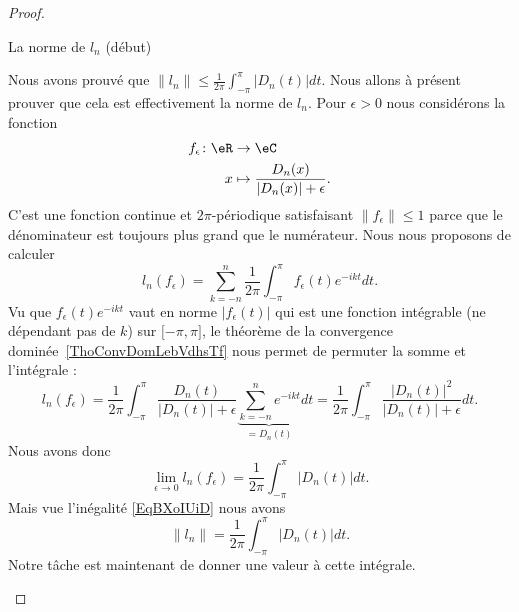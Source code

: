 \begin{proof}
\begin{subproof}
        \item[La norme de \( l_n\) (début)]

            Nous avons prouvé que \( \| l_n \|\leq \frac{1}{ 2\pi }\int_{-\pi}^{\pi}| D_n(t) |dt\). Nous allons à présent prouver que cela est effectivement la norme de \( l_n\). Pour \( \epsilon>0\) nous considérons la fonction
            \begin{equation}
                \begin{aligned}
                    f_{\epsilon}\colon \eR&\to \eC \\
                    x&\mapsto \frac{ D_n(x) }{ | D_n(x) |+\epsilon }.
                \end{aligned}
            \end{equation}
            C'est une fonction continue et \( 2\pi\)-périodique satisfaisant \( \| f_{\epsilon} \|\leq 1\) parce que le dénominateur est toujours plus grand que le numérateur. Nous nous proposons de calculer
            \begin{equation}
                l_n(f_{\epsilon})=\sum_{k=-n}^n\frac{1}{ 2\pi }\int_{-\pi}^{\pi}f_{\epsilon}(t) e^{-ikt}dt.
            \end{equation}
            Vu que \( f_{\epsilon}(t) e^{-ikt}\) vaut en norme \( | f_{\epsilon}(t) |\) qui est une fonction intégrable (ne dépendant pas de \( k\)) sur \( \mathopen[ -\pi , \pi \mathclose]\), le théorème de la convergence dominée~\ref{ThoConvDomLebVdhsTf} nous permet de permuter la somme et l'intégrale :
            \begin{equation}
                l_n(f_{\epsilon})=\frac{1}{ 2\pi }\int_{-\pi}^{\pi}\frac{ D_n(t) }{ | D_n(t) |+\epsilon }\underbrace{\sum_{k=-n}^n e^{-ikt}}_{=D_n(t)}dt=\frac{1}{ 2\pi }\int_{-\pi}^{\pi}\frac{ \big| D_n(t) \big|^2 }{ | D_n(t) |+\epsilon }dt.
            \end{equation}
            Nous avons donc
            \begin{equation}
                \lim_{\epsilon\to 0}l_n(f_{\epsilon})=\frac{1}{ 2\pi }\int_{-\pi}^{\pi}| D_n(t) |dt.
            \end{equation}
            Mais vue l'inégalité \eqref{EqBXoIUiD} nous avons
            \begin{equation}
                \| l_n \|=\frac{1}{ 2\pi }\int_{-\pi}^{\pi}| D_n(t) |dt.
            \end{equation}
            Notre tâche est maintenant de donner une valeur à cette intégrale.


\end{subproof}
\end{proof}
